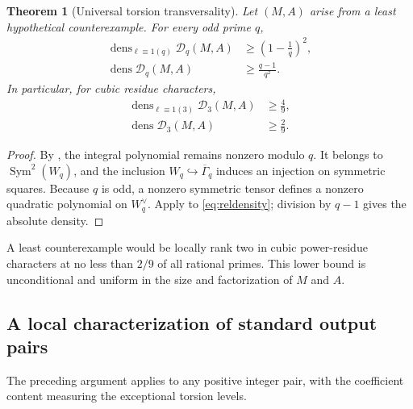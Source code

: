 \documentclass[11pt]{article}
\numberwithin{equation}{section}
\newtheorem{theorem}{Theorem}[section]
\theoremstyle{definition}
\theoremstyle{remark}
\newcommand{\Sym}{\operatorname{Sym}}
\newcommand{\dens}{\operatorname{dens}}
\begin{document}
\begin{theorem}[Universal torsion transversality]
\label{thm:universal}
Let \((M,A)\) arise from a least hypothetical counterexample.  For every odd prime \(q\),
\begin{align}
 \dens_{\ell\equiv1(q)}\mathscr D_q(M,A)
 &\ge\left(1-\frac1q\right)^2,\label{eq:relativebound}\\
 \dens\mathscr D_q(M,A)
 &\ge\frac{q-1}{q^2}.\label{eq:absolutebound}
\end{align}
In particular, for cubic residue characters,
\begin{align}
 \dens_{\ell\equiv1(3)}\mathscr D_3(M,A)&\ge\frac49,\label{eq:cubicrelative}\\
 \dens\mathscr D_3(M,A)&\ge\frac29.\label{eq:cubicabsolute}
\end{align}
\end{theorem}

\begin{proof}
By , the integral polynomial remains nonzero modulo \(q\).  It belongs
to \(\Sym^2(W_q)\), and the inclusion \(W_q\hookrightarrow\overline\Gamma_q\) induces an
injection on symmetric squares.  Because \(q\) is odd, a nonzero symmetric tensor defines a
nonzero quadratic polynomial on \(W_q^\vee\).  Apply  to
\eqref{eq:reldensity}; division by \(q-1\) gives the absolute density.
\end{proof}

\begin{resultbox}
A least counterexample would be locally rank two in cubic power-residue characters at no less
than \(2/9\) of all rational primes.  This lower bound is unconditional and uniform in the
size and factorization of \(M\) and \(A\).
\end{resultbox}

\subsection{A local characterization of standard output pairs}

The preceding argument applies to any positive integer pair, with the coefficient content
measuring the exceptional torsion levels.
\end{document}
